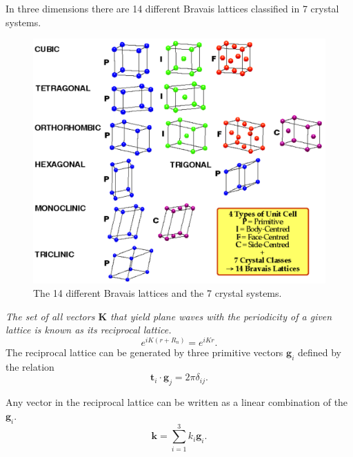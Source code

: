 \documentclass[12pt,a4paper,english]{beamer}
\newcommand{\mbf}{ \mathbf }
\begin{document}
\begin{frame}
  In three dimensions there are 14 different Bravais lattices classified in 7
  crystal systems.

  \begin{figure}[htp]
\centering
\includegraphics[scale=0.3]{Bravais}
\caption{The 14 different Bravais lattices and the 7 crystal systems.}
\label{fig:bravais}
\end{figure}
\end{frame}

\begin{frame}
  \emph{The set of all vectors $\mbf{K}$ that yield plane waves with the periodicity of a given lattice is known as its reciprocal lattice.}
  $$e^{iK(r+R_n)}=e^{iKr}.$$
  The reciprocal lattice can be generated by three primitive vectors $\mbf g_i$
  defined by the relation 
  $$\mbf t_i\cdot \mbf g_j=2\pi\delta_{ij}.$$

  Any vector in the reciprocal lattice can be written as a linear combination of  the $\mbf g_i.$
  $$\mbf k= \sum_{i=1}^3 k_i\mbf g_i.$$

\end{frame}

\end{document}
